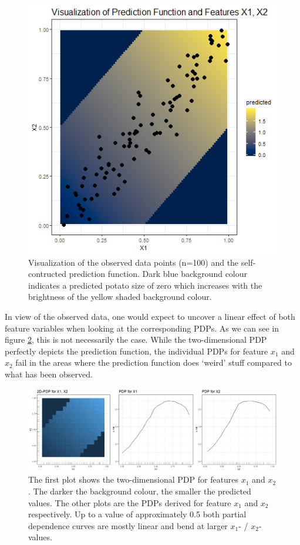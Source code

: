 \documentclass[]{krantz}
\begin{document}
\begin{figure}

{\centering \includegraphics[width=0.6\linewidth]{images/VK_PDP_27_Prediction_Fct} 

}

\caption{Visualization of the observed data points (n=100) and the self-contructed prediction function. Dark blue background colour indicates a predicted potato size of zero which increases with the brightness of the yellow shaded background colour.}\label{fig:Figure27}
\end{figure}

In view of the observed data, one would expect to uncover a linear
effect of both feature variables when looking at the corresponding PDPs.
As we can see in figure \ref{fig:Figure28}, this is not necessarily the
case. While the two-dimensional PDP perfectly depicts the prediction
function, the individual PDPs for feature \(x_1\) and \(x_2\) fail in
the areas where the prediction function does `weird' stuff compared to
what has been observed.

\begin{figure}

\includegraphics[width=1.1\linewidth]{images/VK_PDP_28_Prediction_Fct_Fail} \hfill{}

\caption{The first plot shows the two-dimensional PDP for features $x_1$ and $x_2$. The darker the background colour, the smaller the predicted values. The other plots are the PDPs derived for feature $x_1$ and $x_2$ respectively. Up to a value of approximately 0.5 both partial dependence curves are mostly linear and bend at larger $x_1$- / $x_2$-values.}\label{fig:Figure28}
\end{figure}
\end{document}
